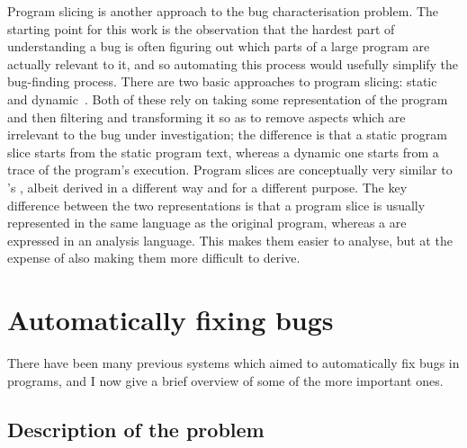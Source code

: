 Program slicing is another approach to the bug characterisation
problem.  The starting point for this work is the observation that the
hardest part of understanding a bug is often figuring out which parts
of a large program are actually relevant to it, and so automating this
process would usefully simplify the bug-finding process.  There are
two basic approaches to program slicing: static~\cite{Weiser1981} and
dynamic~\cite{Agrawal1990a}.  Both of these rely on taking some
representation of the program and then filtering and transforming it
so as to remove aspects which are irrelevant to the bug under
investigation; the difference is that a static program slice starts
from the static program text, whereas a dynamic one starts from a
trace of the program's execution.  Program slices are conceptually
very similar to {\technique}'s {\StateMachines}, albeit derived in a
different way and for a different purpose.  The key difference between
the two representations is that a program slice is usually represented
in the same language as the original program, whereas a
{\StateMachines} are expressed in an analysis language.  This makes
them easier to analyse, but at the expense of also making them more
difficult to derive.

\section{Automatically fixing bugs}

There have been many previous systems which aimed to automatically fix
bugs in programs, and I now give a brief overview of some of the more
important ones.

\subsection{Description of the problem}


